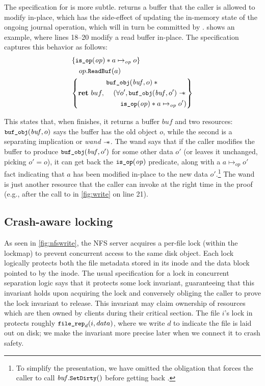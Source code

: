 The specification for  is more subtle.  
returns a buffer that the caller is allowed to modify in-place, which
has the side-effect of updating the in-memory state of the ongoing journal operation, which
will in turn be committed by .   shows
an example, where lines 18--20 modify a read buffer in-place.  The specification
captures this behavior as follows:
%
\begin{align*}
  \hoareV{\cc{is_op}(\mathit{op}) \sep a \mapsto_{\mathit{op}} o}%
        {op.\cc{ReadBuf}(a)}%
        {\Ret{buf}
  \begin{aligned}
  &\cc{buf_obj}(\mathit{buf}, o) \sep \phantom{} \\
  &\quad( \forall o', \cc{buf_obj}(\mathit{buf}, o') \wand \\
  &\quad\quad \cc{is_op}(\mathit{op}) \sep a \mapsto_{\mathit{op}} o' )
    \end{aligned}}
\end{align*}

This states that, when  finishes, it returns a buffer $\mathit{buf}$
and two resources: $\cc{buf_obj}(\mathit{buf}, o)$ says the buffer has the old
object $o$, while the second is a separating implication or \emph{wand} $\mathrel{-\!\!\ast}$.
The wand says that if
the caller modifies the buffer to produce $\cc{buf_obj}(\mathit{buf}, o')$ for
some other data $o'$ (or leaves it unchanged, picking $o' = o$), it can get back
the $\cc{is_op}(\mathit{op})$ predicate, along with a
$a \mapsto_{\mathit{op}} o'$ fact indicating that $a$ has been modified in-place
to the new data $o'$.\footnote{To simplify the presentation, we have omitted
the obligation that forces the caller to call $\mathit{buf}.\cc{SetDirty}()$
before getting back .} The wand is just another resource that the
caller can invoke at the right time in the proof (e.g., after the call to
 in \cref{fig:write} on line 21).

\subsection{Crash-aware locking}
\label{s:design:crashlock}

As seen in \cref{fig:nfswrite}, the NFS server acquires a per-file lock
(within the lockmap) to prevent concurrent access to the same disk object.
Each lock
logically protects both the file metadata stored in its inode and the data block pointed
to by the inode. The usual specification for a lock
in concurrent separation logic says
that it protects some lock invariant, guaranteeing that this
invariant holds upon acquiring the lock and conversely obliging the caller to
prove the lock invariant to release.
This invariant may claim ownership of resources which are then owned by clients during their critical section.
The file $i$'s lock in \simplenfs protects
roughly $\cc{file_rep}_{d}(i, data)$, where we write $d$ to indicate the file is
laid out on disk; we make the invariant more precise later when we connect it to
crash safety.

